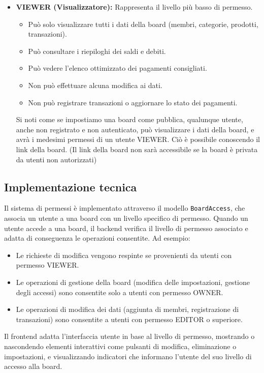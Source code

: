 \documentclass[11pt]{article}
\begin{document}
\begin{itemize}
    \item \textbf{VIEWER (Visualizzatore):} Rappresenta il livello più basso di permesso.
    \begin{itemize}
        \item Può solo visualizzare tutti i dati della board (membri, categorie, prodotti, transazioni).
        \item Può consultare i riepiloghi dei saldi e debiti.
        \item Può vedere l'elenco ottimizzato dei pagamenti consigliati.
        \item Non può effettuare alcuna modifica ai dati.
        \item Non può registrare transazioni o aggiornare lo stato dei pagamenti.
    \end{itemize}
    Si noti come se impostiamo una board come pubblica, qualunque utente, anche non registrato e non autenticato, può visualizzare i dati della board, e avrà i medesimi permessi di un utente VIEWER. Ciò è possibile conoscendo il link della board. (Il link della board non sarà accessibile se la board è privata da utenti non autorizzati)
\end{itemize}

\subsection{Implementazione tecnica}
Il sistema di permessi è implementato attraverso il modello \texttt{BoardAccess}, che associa un utente a una board con un livello specifico di permesso. Quando un utente accede a una board, il backend verifica il livello di permesso associato e adatta di conseguenza le operazioni consentite. Ad esempio:

\begin{itemize}
    \item Le richieste di modifica vengono respinte se provenienti da utenti con permesso VIEWER.
    \item Le operazioni di gestione della board (modifica delle impostazioni, gestione degli accessi) sono consentite solo a utenti con permesso OWNER.
    \item Le operazioni di modifica dei dati (aggiunta di membri, registrazione di transazioni) sono consentite a utenti con permesso EDITOR o superiore.
\end{itemize}

Il frontend adatta l'interfaccia utente in base al livello di permesso, mostrando o nascondendo elementi interattivi come pulsanti di modifica, eliminazione o impostazioni, e visualizzando indicatori che informano l'utente del suo livello di accesso alla board.
\end{document}
